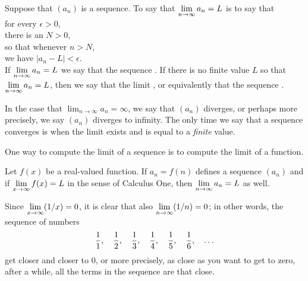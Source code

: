 \begin{definition} \relax{}
Suppose that $\left(a_n\right)$ is a sequence.
To say that $\displaystyle \lim_{n\to \infty}a_n=L$ is to say that \\
\null\quad for every $\epsilon>0$, \\
\null\quad\quad there is an $N > 0$, \\
\null\quad so that whenever $n>N$, \\
\null\quad\quad we have $|a_n-L|<\epsilon$. \\
If $\displaystyle \lim_{n\to\infty}a_n=L$ we say that the sequence
.  If there is no finite value $L$ so
that $\displaystyle \lim_{n\to\infty}a_n = L$, then we say that the limit
, or equivalently that the sequence
.
\end{definition} 


\begin{warning}
  In the case that $\lim_{n \to \infty} a_n = \infty$, we say that
  $(a_n)$ diverges, or perhaps more precisely, we say $(a_n)$ diverges to
  infinity.  The only time we say that a sequence converges is when
  the limit exists and is equal to a \textit{finite} value.
\end{warning}

One way to compute the limit of a sequence is to compute the limit of
a function.
\begin{theorem}
  Let $f(x)$ be a real-valued function.  If $a_n = f(n)$ defines a
  sequence $(a_n)$ and if $\displaystyle \lim_{x\to\infty}f(x)=L$ in the sense of Calculus
  One, then $\displaystyle \lim_{n\to\infty} a_n=L$ as well.
\end{theorem}

\begin{example}
Since $\displaystyle \lim_{x\to\infty}(1/x)=0$, it is
clear that also $\displaystyle \lim_{n\to\infty}(1/n)=0$; in other words, the sequence of numbers
$${1\over1},\quad {1\over2},\quad {1\over3},\quad {1\over4},\quad {1\over5},\quad {1\over6},\quad \ldots$$
get closer and closer to 0, or more precisely, as close as you want to get to zero, after a while, all the terms in the sequence are that close.
\end{example}


